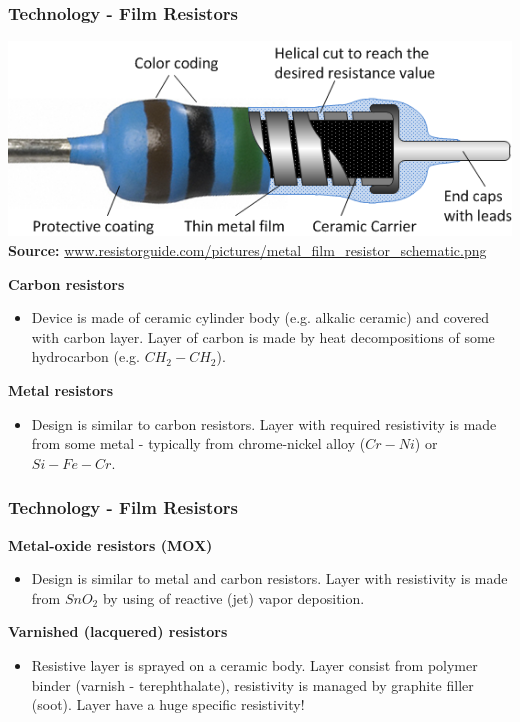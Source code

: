 \documentclass{beamer}
\begin{document}
	\begin{frame}
    \frametitle{Technology - Film Resistors}
		\begin{center}
		\includegraphics[scale=0.4]{obr07_sroubovice.png}\\
		\tiny{\textbf{Source: }\url{www.resistorguide.com/pictures/metal_film_resistor_schematic.png}}\\
		\end{center}
		\textbf{Carbon resistors}
		\begin{itemize}
			\item \small{Device is made of ceramic cylinder body (e.g. alkalic ceramic) and covered with carbon layer. Layer of carbon is made by heat decompositions of some hydrocarbon (e.g. $CH_2-CH_2$).}
		\end{itemize}
		
		\textbf{Metal resistors}
		\begin{itemize}
			\item \small{Design is similar to carbon resistors. Layer with required resistivity is made from some metal - typically from chrome-nickel alloy ($Cr-Ni$) or $Si-Fe-Cr$.}
		\end{itemize}
  \end{frame}
	\begin{frame}
    \frametitle{Technology - Film Resistors}
		\textbf{Metal-oxide resistors (MOX)}
		\begin{itemize}
			\item Design is similar to metal and carbon resistors. Layer with resistivity is made from $SnO_2$ by using of  reactive (jet) vapor deposition.
		\end{itemize}
		
		\textbf{Varnished (lacquered) resistors}
		\begin{itemize}
			\item Resistive layer is sprayed on a ceramic body. Layer consist from polymer binder (varnish - terephthalate), resistivity is managed by graphite filler (soot). Layer have a huge specific resistivity!
		\end{itemize}
  \end{frame}
\end{document}
